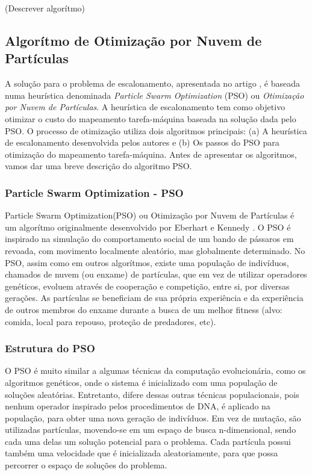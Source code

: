 \documentclass[a4paper,10pt]{article}
\begin{document}
(Descrever algorítmo)

\subsection{Algorítmo de Otimização por Nuvem de Partículas}

A solução para o problema de escalonamento, apresentada no artigo \cite{pso_a}, é baseada numa heurística 
denominada \emph{Particle Swarm Optimization} (PSO) ou \emph{Otimização por Nuvem de Partículas}. A heurística de 
escalonamento tem como objetivo otimizar 
o custo do mapeamento tarefa-máquina baseada na solução dada pelo PSO. O processo de otimização utiliza 
dois algoritmos principais: (a) A heurística de escalonamento desenvolvida pelos autores e (b) Os passos do PSO 
para otimização do mapeamento tarefa-máquina. Antes de apresentar os algoritmos, vamos 
dar uma breve descrição do algoritmo PSO.

\subsubsection{Particle Swarm Optimization - PSO}

Particle Swarm Optimization(PSO) ou Otimização por Nuvem de Partículas é um algorítmo originalmente 
desenvolvido por Eberhart e Kennedy \cite{pso_article}. O PSO é inspirado na simulação do comportamento social de um 
bando de pássaros em revoada, com movimento localmente aleatório, mas globalmente determinado. No PSO, 
assim como em outros algorítmos, existe uma população de indivíduos, chamados de nuvem (ou enxame) de 
partículas, que em vez de utilizar operadores genéticos, evoluem através de cooperação e competição, entre si, 
por diversas gerações. As partículas se beneficiam de sua própria experiência e da experiência de outros membros 
do enxame durante a busca de um melhor fitness (alvo: comida, local para repouso, proteção de predadores, etc).

\subsubsection{Estrutura do PSO}

O PSO é muito similar a algumas técnicas da computação evolucionária, como os algoritmos genéticos, onde o 
sistema é inicializado com uma população de soluções aleatórias. Entretanto, difere dessas outras técnicas 
populacionais, pois nenhum operador inspirado pelos procedimentos de DNA, é aplicado na população, para obter 
uma nova geração de indivíduos. Em vez de mutação, são utilizadas partículas, movendo-se em um espaço de busca 
n-dimensional, sendo cada uma delas um solução potencial para o problema. Cada partícula possui também uma 
velocidade que é inicializada aleatoriamente, para que possa percorrer o espaço de soluções do problema.
\end{document}

